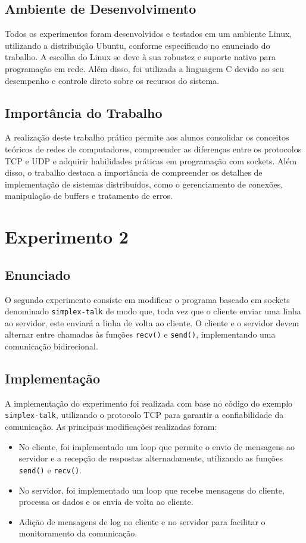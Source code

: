 \subsection*{Ambiente de Desenvolvimento}

Todos os experimentos foram desenvolvidos e testados em um ambiente Linux, utilizando a distribuição Ubuntu, conforme especificado no enunciado do trabalho. A escolha do Linux se deve à sua robustez e suporte nativo para programação em rede. Além disso, foi utilizada a linguagem C devido ao seu desempenho e controle direto sobre os recursos do sistema.

\subsection*{Importância do Trabalho}

A realização deste trabalho prático permite aos alunos consolidar os conceitos teóricos de redes de computadores, compreender as diferenças entre os protocolos TCP e UDP e adquirir habilidades práticas em programação com sockets. Além disso, o trabalho destaca a importância de compreender os detalhes de implementação de sistemas distribuídos, como o gerenciamento de conexões, manipulação de buffers e tratamento de erros.

\section*{Experimento 2}

\subsection*{Enunciado}

O segundo experimento consiste em modificar o programa baseado em sockets denominado \texttt{simplex-talk} de modo que, toda vez que o cliente enviar uma linha ao servidor, este enviará a linha de volta ao cliente. O cliente e o servidor devem alternar entre chamadas às funções \texttt{recv()} e \texttt{send()}, implementando uma comunicação bidirecional.

\subsection*{Implementação}

A implementação do experimento foi realizada com base no código do exemplo \texttt{simplex-talk}, utilizando o protocolo TCP para garantir a confiabilidade da comunicação. As principais modificações realizadas foram:
\begin{itemize}
    \item No cliente, foi implementado um loop que permite o envio de mensagens ao servidor e a recepção de respostas alternadamente, utilizando as funções \texttt{send()} e \texttt{recv()}.
    \item No servidor, foi implementado um loop que recebe mensagens do cliente, processa os dados e os envia de volta ao cliente.
    \item Adição de mensagens de log no cliente e no servidor para facilitar o monitoramento da comunicação.
\end{itemize}

